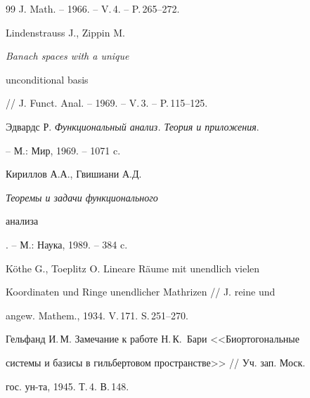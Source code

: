 \begin{thebibliography}{99}
J.  Math. -- 1966. -- V.\,4. -- P.\,265--272.




Lindenstrauss J., Zippin M. {\em Banach spaces with a unique


unconditional basis} // J. Funct. Anal. -- 1969. -- V.\,3. -- P.\,115--125.




Эдвардс Р. {\em Функциональный анализ. Теория и приложения}.


-- М.: Мир, 1969. -- 1071 c.




Кириллов А.А., Гвишиани А.Д. {\em Теоремы и задачи функционального


анализа}. -- М.: Наука, 1989. -- 384 c.





\end{thebibliography}





\vskip 2cm












\label{end}













K\"othe G., Toeplitz O. Lineare R\"aume mit unendlich vielen


Koordinaten und Ringe unendlicher  Mathrizen // J. reine und


angew. Mathem., 1934. V.\,171. S.\,251--270.







Гельфанд И.\,М. Замечание к работе Н.\,К.~Бари <<Биортогональные


системы и базисы в гильбертовом пространстве>> // Уч. зап. Моск.


гос. ун-та, 1945. Т.\,4. В.\,148.





